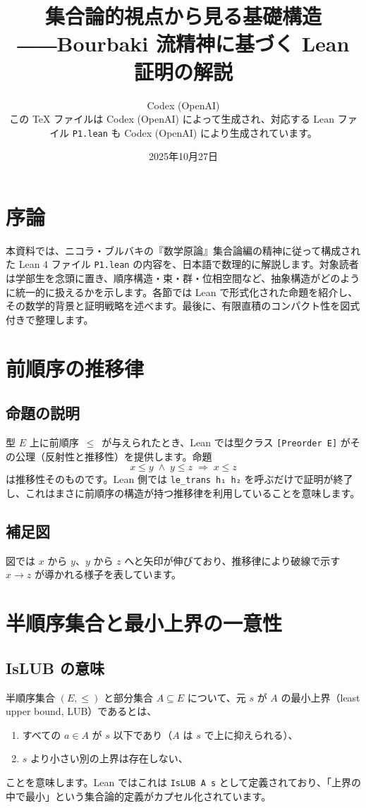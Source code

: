 \documentclass[10pt]{ltjsarticle}
\title{集合論的視点から見る基礎構造\\――Bourbaki 流精神に基づく Lean 証明の解説}
\author{Codex (OpenAI)\\[2mm]
{\small この \TeX{} ファイルは Codex (OpenAI) によって生成され、対応する Lean ファイル \texttt{P1.lean} も Codex (OpenAI) により生成されています。}}
\date{2025年10月27日}
\begin{document}
\maketitle

\tableofcontents

\section{序論}
本資料では、ニコラ・ブルバキの『数学原論』集合論編の精神に従って構成された Lean 4 ファイル \texttt{P1.lean} の内容を、日本語で数理的に解説します。対象読者は学部生を念頭に置き、順序構造・束・群・位相空間など、抽象構造がどのように統一的に扱えるかを示します。各節では Lean で形式化された命題を紹介し、その数学的背景と証明戦略を述べます。最後に、有限直積のコンパクト性を図式付きで整理します。

\section{前順序の推移律}
\subsection{命題の説明}
型 $E$ 上に前順序 $\,\leq\,$ が与えられたとき、Lean では型クラス \verb|[Preorder E]| がその公理（反射性と推移性）を提供します。命題
\[
  x \leq y \;\land\; y \leq z \;\Rightarrow\; x \leq z
\]
は推移性そのものです。Lean 側では \verb|le_trans h₁ h₂| を呼ぶだけで証明が終了し、これはまさに前順序の構造が持つ推移律を利用していることを意味します。

\subsection{補足図}

\noindent
図では $x$ から $y$、$y$ から $z$ へと矢印が伸びており、推移律により破線で示す $x \to z$ が導かれる様子を表しています。

\section{半順序集合と最小上界の一意性}
\subsection{IsLUB の意味}
半順序集合 $(E,\leq)$ と部分集合 $A \subseteq E$ について、元 $s$ が $A$ の最小上界（least upper bound, LUB）であるとは、
\begin{enumerate}
  \item すべての $a \in A$ が $s$ 以下であり（$A$ は $s$ で上に抑えられる）、
  \item $s$ より小さい別の上界は存在しない、
\end{enumerate}
ことを意味します。Lean ではこれは \verb|IsLUB A s| として定義されており、「上界の中で最小」という集合論的定義がカプセル化されています。
\end{document}
